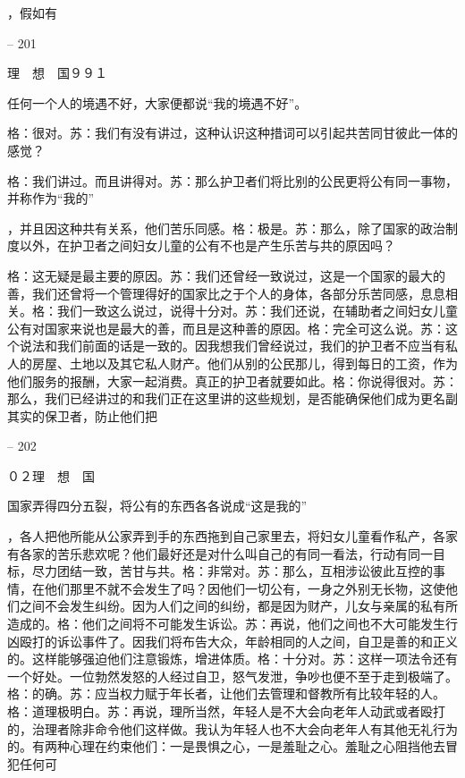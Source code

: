 \documentclass[11pt,oneside]{book}
\begin{document}
\begin{common-format}
    ，假如有

    

-- 201

    理　想　国９９１

    任何一个人的境遇不好，大家便都说“我的境遇不好”。

    格：很对。苏：我们有没有讲过，这种认识这种措词可以引起共苦同甘彼此一体的感觉？

    格：我们讲过。而且讲得对。苏：那么护卫者们将比别的公民更将公有同一事物，并称作为“我的”

    ，并且因这种共有关系，他们苦乐同感。格：极是。苏：那么，除了国家的政治制度以外，在护卫者之间妇女儿童的公有不也是产生乐苦与共的原因吗？

    格：这无疑是最主要的原因。苏：我们还曾经一致说过，这是一个国家的最大的善，我们还曾将一个管理得好的国家比之于个人的身体，各部分乐苦同感，息息相关。格：我们一致这么说过，说得十分对。苏：我们还说，在辅助者之间妇女儿童公有对国家来说也是最大的善，而且是这种善的原因。格：完全可这么说。苏：这个说法和我们前面的话是一致的。因我想我们曾经说过，我们的护卫者不应当有私人的房屋、土地以及其它私人财产。他们从别的公民那儿，得到每日的工资，作为他们服务的报酬，大家一起消费。真正的护卫者就要如此。格：你说得很对。苏：那么，我们已经讲过的和我们正在这里讲的这些规划，是否能确保他们成为更名副其实的保卫者，防止他们把

    

-- 202

    ０２理　想　国

    国家弄得四分五裂，将公有的东西各各说成“这是我的”

    ，各人把他所能从公家弄到手的东西拖到自己家里去，将妇女儿童看作私产，各家有各家的苦乐悲欢呢？他们最好还是对什么叫自己的有同一看法，行动有同一目标，尽力团结一致，苦甘与共。格：非常对。苏：那么，互相涉讼彼此互控的事情，在他们那里不就不会发生了吗？因他们一切公有，一身之外别无长物，这使他们之间不会发生纠纷。因为人们之间的纠纷，都是因为财产，儿女与亲属的私有所造成的。格：他们之间将不可能发生诉讼。苏：再说，他们之间也不大可能发生行凶殴打的诉讼事件了。因我们将布告大众，年龄相同的人之间，自卫是善的和正义的。这样能够强迫他们注意锻炼，增进体质。格：十分对。苏：这样一项法令还有一个好处。一位勃然发怒的人经过自卫，怒气发泄，争吵也便不至于走到极端了。格：的确。苏：应当权力赋于年长者，让他们去管理和督教所有比较年轻的人。格：道理极明白。苏：再说，理所当然，年轻人是不大会向老年人动武或者殴打的，治理者除非命令他们这样做。我认为年轻人也不大会向老年人有其他无礼行为的。有两种心理在约束他们：一是畏惧之心，一是羞耻之心。羞耻之心阻挡他去冒犯任何可


\end{common-format}
\end{document}
